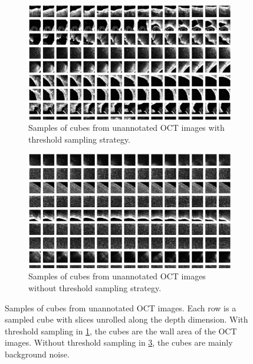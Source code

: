 \documentclass[a4paper,11pt,oneside]{report}
\begin{document}
\begin{figure}[t]
    \centering
    \begin{subfigure}{0.48\textwidth}
        \centering
        \includegraphics[width=0.9\linewidth]{figures/fig_implementation_genesis_extracted_cube.png}
        \caption{Samples of cubes from unannotated OCT images with threshold sampling strategy.}
        \label{fig:genesis-cubes-with-threshold}

    \end{subfigure}%
    \hfill
    \begin{subfigure}{0.48\textwidth}
        \centering
        \includegraphics[width=0.9\linewidth]{figures/fig_implementation_genesis_extracted_cube_no_threshold.png}
        \caption{Samples of cubes from unannotated OCT images without threshold sampling strategy.}
        \label{fig:genesis-cubes-without-threshold}
    \end{subfigure}
    \caption{Samples of cubes from unannotated OCT images. Each row is a sampled cube with slices unrolled along the depth dimension. With threshold sampling in \ref{fig:genesis-cubes-with-threshold}, the cubes are the wall area of the OCT images. Without threshold sampling in \ref{fig:genesis-cubes-without-threshold}, the cubes are mainly background noise.}
\end{figure}
\end{document}
